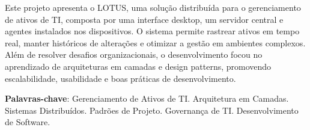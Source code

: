 \setlength{\absparsep}{18pt} %
\begin{resumo}[RESUMO]
Este projeto apresenta o LOTUS, uma solução distribuída para o gerenciamento de ativos de TI, composta por uma interface desktop, um servidor central e agentes instalados nos dispositivos. O sistema permite rastrear ativos em tempo real, manter históricos de alterações e otimizar a gestão em ambientes complexos. Além de resolver desafios organizacionais, o desenvolvimento focou no aprendizado de arquiteturas em camadas e design patterns, promovendo escalabilidade, usabilidade e boas práticas de desenvolvimento.


\textbf{Palavras-chave}: Gerenciamento de Ativos de TI. Arquitetura em Camadas. Sistemas Distribuídos. Padrões de Projeto. Governança de TI. Desenvolvimento de Software.
\end{resumo}
